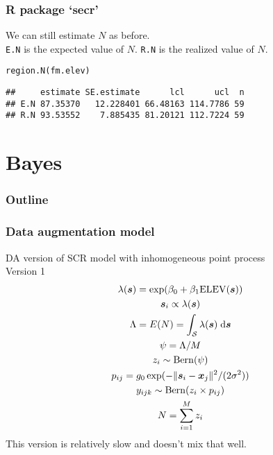 \documentclass[color=usenames,dvipsnames]{beamer}\usepackage[]{graphicx}\usepackage[]{color}
\makeatletter
\newcommand{\hlstd}[1]{\textcolor[rgb]{0,0,0}{#1}}%
\newcommand{\hlkwd}[1]{\textcolor[rgb]{0.004,0.004,0.506}{#1}}%
\newenvironment{kframe}{%
 \def\at@end@of@kframe{}%
 \ifinner\ifhmode%
  \def\at@end@of@kframe{\end{minipage}}%
  \begin{minipage}{\columnwidth}%
 \fi\fi%
 \def\FrameCommand##1{\hskip\@totalleftmargin \hskip-\fboxsep
 \colorbox{shadecolor}{##1}\hskip-\fboxsep
     \hskip-\linewidth \hskip-\@totalleftmargin \hskip\columnwidth}%
 \MakeFramed {\advance\hsize-\width
   \@totalleftmargin\z@ \linewidth\hsize
   \@setminipage}}%
 {\par\unskip\endMakeFramed%
 \at@end@of@kframe}
\newenvironment{knitrout}{}{} %
\newcommand{\inr}[1]{\colorbox{inlinecolor}{\texttt{#1}}}
\makeatother
\begin{document}
\begin{frame}[fragile]
  \frametitle{R package `secr'}
  We can still estimate $N$ as before. \\
  \vfill
  \inr{E.N} is the expected value of
  $N$. \inr{R.N} is the realized value of $N$. 
  \vfill
\begin{knitrout}\small
{}\color{fgcolor}\begin{kframe}
\begin{alltt}
\hlkwd{region.N}\hlstd{(fm.elev)}
\end{alltt}
\begin{verbatim}
##     estimate SE.estimate      lcl      ucl  n
## E.N 87.35370   12.228401 66.48163 114.7786 59
## R.N 93.53552    7.885435 81.20121 112.7224 59
\end{verbatim}
\end{kframe}
\end{knitrout}
\end{frame}




\section{Bayes}




\begin{frame}
  \frametitle{Outline}
  \Large
  \tableofcontents[currentsection]
\end{frame}





\begin{frame}
  \frametitle{Data augmentation model}
  DA version of SCR model with inhomogeneous point process \\
  \centering
  Version 1 \\
  \begin{gather*}
    \lambda({\bm s}) = \exp(\beta_0 + \beta_1 \mathrm{ELEV}({\bm s})) \\
    {\bm s}_i \propto \lambda({\bm s}) \\
    \Lambda = E(N) = \int_{\mathcal{S}} \lambda({\bm s})\; \mathrm{d}{\bm s} \\
    \psi = \Lambda/M \\
    z_i \sim \mathrm{Bern}(\psi) \\
    p_{ij} = g_0\exp(-\|{\bm s}_i-{\bm x}_j\|^2/(2\sigma^2)) \\
    y_{ijk} \sim \mathrm{Bern}(z_i\times p_{ij}) \\
    N=\sum_{i=1}^M z_i
  \end{gather*}
  \pause \vfill
  This version is relatively slow and doesn't mix that well. \\
\end{frame}
\end{document}

